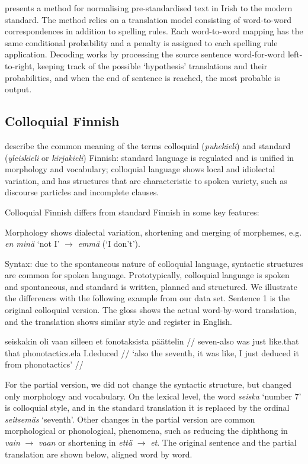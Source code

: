 \documentclass[11pt]{article}
\begin{document}
 presents a method for normalising pre-standardised text in Irish to 
the modern standard. The method relies on a translation model consisting of word-to-word 
correspondences in addition to spelling rules. Each word-to-word mapping has the same
conditional probability and a penalty is assigned to each spelling rule application. Decoding
works by processing the source sentence word-for-word left-to-right, keeping track of the 
possible `hypothesis' translations and their probabilities, and when the end of 
sentence is reached, the most probable is output.

\subsection{Colloquial Finnish}


 describe the common meaning of the terms colloquial (\emph{puhekieli}) and standard (\emph{yleiskieli} or \emph{kirjakieli}) Finnish: standard language is regulated and is unified in morphology and vocabulary; colloquial language shows local and idiolectal variation, and has structures that are characteristic to spoken variety,  such as discourse particles and incomplete clauses.



Colloquial Finnish differs from standard Finnish in some key features: 

Morphology shows dialectal variation, shortening and merging of morphemes, e.g. \emph{en min\"{a}} `not I' $\rightarrow$ \emph{emm\"{a}} (`I don't').

Syntax: due to the spontaneous nature of colloquial language, syntactic structures are common for spoken language. 
Prototypically, colloquial language is spoken and spontaneous, and standard is written, planned and structured. We illustrate the differences with the following example from our data set. Sentence 1 is the original colloquial version. The gloss shows the actual word-by-word translation, and the translation shows similar style and register in English.

\ex
\begingl
\gla seiskakin oli vaan silleen et fonotaksista p\"{a}\"{a}ttelin //
\glb seven-{\sc also} was just like.that that phonotactics.{\sc ela} I.deduced //
\glft `also the seventh, it was like, I just deduced it from phonotactics' //
\endgl
\xe


For the partial version, we did not change the syntactic structure, but changed only morphology and vocabulary. On the lexical level, the word \emph{seiska} `number 7' is colloquial style, and in the standard translation it is replaced by the ordinal \emph{seitsem\"{a}s} `seventh'.  Other changes in the partial version are common morphological or phonological, phenomena, such as reducing the diphthong in \emph{vain} $\rightarrow$ \emph{vaan} or shortening in  \emph{ett\"{a}} $\rightarrow$ \emph{et}. The original sentence and the partial translation are shown below, aligned word by word.
\end{document}

